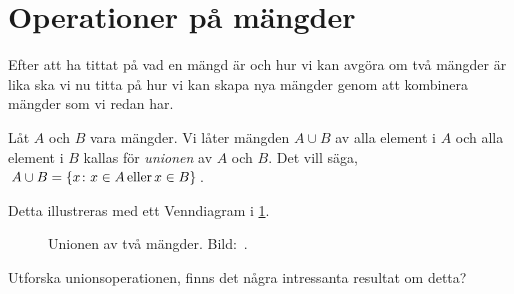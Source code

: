 \section{Operationer på mängder}
\label{sec:Mangdoperationer}
Efter att ha tittat på vad en mängd är och hur vi kan avgöra om
två mängder är lika ska vi nu titta på hur vi kan skapa nya mängder genom att
kombinera mängder som vi redan har.

\begin{definition}\label{def:Union}
  Låt \(A\) och \(B\) vara mängder.
  Vi låter mängden \(A\cup B\) av alla element i \(A\) och alla element i
  \(B\) kallas för \emph{unionen} av \(A\) och \(B\).
  Det vill säga, \(A\cup B = \{x\colon x\in A\operatorname{eller} x\in B\}\).
\end{definition}
Detta illustreras med ett Venndiagram i \cref{fig:Union}.
\begin{figure}
  \caption{%
    Unionen av två mängder.
    Bild:~\cite{Wikipedia2013Set}.
  }\label{fig:Union}
\end{figure}

\begin{exercise}
  Utforska unionsoperationen, finns det några intressanta resultat om detta?
\end{exercise}

